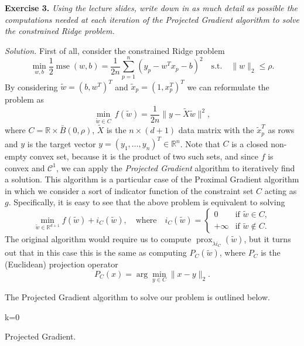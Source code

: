 \documentclass[11pt]{article}
\begin{document}
\textbf{Exercise 3.} \textit{Using the lecture slides, write down in as much detail as possible the computations needed at each iteration of the Projected Gradient algorithm to solve the constrained Ridge problem.}

\textit{Solution.} First of all, consider the constrained Ridge problem
\[
\min_{w,b}\frac{1}{2} \operatorname{mse}(w,b)= \frac{1}{2n}\sum_{p=1}^n (y_p-w^Tx_p-b)^2 \quad \text{s.t.} \quad \|w\|_2\leq \rho.
\]
By considering $\tilde w=(b, w^T)^T$ and $\tilde x_p = (1, x_p^T)^T$ we can reformulate the problem as
\[
\min_{\tilde w\in C} \, f(\tilde w)=\frac{1}{2n}\|y - \tilde X\tilde w\|^2,
\]
where $C=\mathbb R \times \bar B(0, \rho)$, $\tilde X$ is the $n\times(d+1)$ data matrix with the $\tilde x_p^T$ as rows and $y$ is the target vector $y=(y_1, \dots, y_n)^T\in \mathbb R^n$. Note that $C$ is a closed non-empty convex set, because it is the product of two such sets, and since $f$ is convex and $\mathscr C^1$, we can apply the \textit{Projected Gradient} algorithm to iteratively find a solution. This algorithm is a particular case of the Proximal Gradient algorithm in which we consider a sort of indicator function of the constraint set $C$ acting as $g$. Specifically, it is easy to see that the above problem is equivalent to solving
\[
\min_{\tilde w \in \mathbb R^{d+1}} f(\tilde w) + i_C(\tilde w), \quad \text{where} \quad i_C(\tilde w)=\begin{cases}0 & \text{if } \tilde w\in C,\\ +\infty & \text{if } \tilde w \notin C.\end{cases}
\]
The original algorithm would require us to compute $\operatorname{prox}_{\lambda i_C}(\tilde w)$, but it turns out that in this case this is the same as computing $P_C(\tilde w)$, where $P_C$ is the (Euclidean) projection operator \[
P_C(x)=\arg\min_{y\in C} \|x-y\|_2.\]

The Projected Gradient algorithm to solve our problem is outlined below.

\begin{algorithm}[H]
\SetNoFillComment
\SetAlgoLined
{}
\DontPrintSemicolon
{}
 k=0\;
 \caption{Projected Gradient.}
\end{algorithm}
\end{document}
